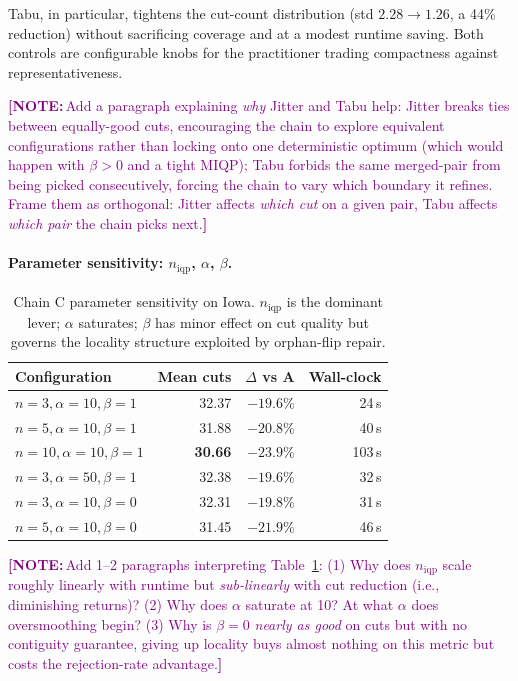 \documentclass[11pt]{article}
\newcommand{\note}[1]{\textcolor{purple}{\textbf{[NOTE:}\,#1\textbf{]}}}
\begin{document}
Tabu, in particular, tightens the cut-count distribution
(std $2.28 \to 1.26$, a 44\% reduction) without sacrificing coverage
and at a modest runtime saving. Both controls are configurable knobs
for the practitioner trading compactness against representativeness.

\note{Add a paragraph explaining \emph{why} Jitter and Tabu help:
Jitter breaks ties between equally-good cuts, encouraging the chain
to explore equivalent configurations rather than locking onto one
deterministic optimum (which would happen with $\beta > 0$ and a tight
MIQP); Tabu forbids the same merged-pair from being picked
consecutively, forcing the chain to vary which boundary it refines.
Frame them as orthogonal: Jitter affects \emph{which cut} on a given
pair, Tabu affects \emph{which pair} the chain picks next.}

\paragraph{Parameter sensitivity: $n_{\mathrm{iqp}}$, $\alpha$, $\beta$.}\label{sec:exp-sensitivity}

\begin{table}[H]
\centering
\small
\begin{tabular}{lrrr}
\toprule
Configuration & Mean cuts & $\Delta$ vs A & Wall-clock \\
\midrule
$n = 3, \alpha = 10, \beta = 1$  & 32.37 & $-19.6\%$ & 24\,s \\
$n = 5, \alpha = 10, \beta = 1$  & 31.88 & $-20.8\%$ & 40\,s \\
\textbf{$n = 10, \alpha = 10, \beta = 1$} & \textbf{30.66} & \textbf{$-23.9\%$} & 103\,s \\
$n = 3, \alpha = 50, \beta = 1$  & 32.38 & $-19.6\%$ & 32\,s \\
$n = 3, \alpha = 10, \beta = 0$  & 32.31 & $-19.8\%$ & 31\,s \\
$n = 5, \alpha = 10, \beta = 0$  & 31.45 & $-21.9\%$ & 46\,s \\
\bottomrule
\end{tabular}
\caption{Chain C parameter sensitivity on Iowa. $n_{\mathrm{iqp}}$ is
  the dominant lever; $\alpha$ saturates; $\beta$ has minor effect
  on cut quality but governs the locality structure exploited by
  orphan-flip repair.}\label{tab:sensitivity}
\end{table}

\note{Add 1--2 paragraphs interpreting Table~\ref{tab:sensitivity}:
(1) Why does $n_{\mathrm{iqp}}$ scale roughly linearly with runtime
but \emph{sub-linearly} with cut reduction (i.e., diminishing returns)?
(2) Why does $\alpha$ saturate at 10? At what $\alpha$ does
oversmoothing begin?
(3) Why is $\beta = 0$ \emph{nearly as good} on cuts but with no
contiguity guarantee, giving up locality buys almost nothing on
this metric but costs the rejection-rate advantage.}
\end{document}
